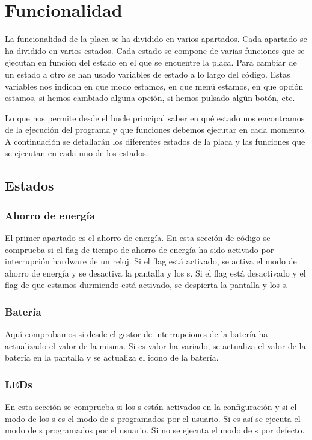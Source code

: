 \section{Funcionalidad}

La funcionalidad de la placa se ha dividido en varios apartados. Cada apartado se ha dividido en varios estados. Cada estado se compone de varias funciones que se ejecutan en función del estado en el que se encuentre la placa. Para cambiar de un estado a otro se han usado variables de estado a lo largo del código. Estas variables nos indican en que modo estamos, en que menú estamos, en que opción estamos, si hemos cambiado alguna opción, si hemos pulsado algún botón, etc.

Lo que nos permite desde el bucle principal saber en qué estado nos encontramos de la ejecución del programa y que funciones debemos ejecutar en cada momento. A continuación se detallarán los diferentes estados de la placa y las funciones que se ejecutan en cada uno de los estados.

\subsection{Estados}
\subsubsection{Ahorro de energía}
El primer apartado es el ahorro de energía. En esta sección de código se comprueba si el flag de tiempo de ahorro de energía ha sido activado por interrupción hardware de un reloj. Si el flag está activado, se activa el modo de ahorro de energía y se desactiva la pantalla y los s. Si el flag está desactivado y el flag de que estamos durmiendo está activado, se despierta la pantalla y los s.

\subsubsection{Batería}
Aquí comprobamos si desde el gestor de interrupciones de la batería ha actualizado el valor de la misma. Si es valor ha variado, se actualiza el valor de la batería en la pantalla y se actualiza el icono de la batería.

\subsubsection{\gls{LED}s}
En esta sección se comprueba si los s están activados en la configuración y si el modo de los s es el modo de s programados por el usuario. Si es así se ejecuta el modo de s programados por el usuario. Si no se ejecuta el modo de s por defecto.

